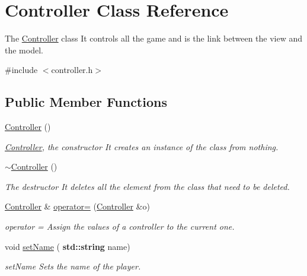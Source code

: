 \hypertarget{class_controller}{}\section{Controller Class Reference}
\label{class_controller}


The \hyperlink{class_controller}{Controller} class It controls all the game and is the link between the view and the model.  




{\ttfamily \#include $<$controller.\+h$>$}

\subsection*{Public Member Functions}
\begin{DoxyCompactItemize}
\item 
\mbox{\label{class_controller_a95c56822d667e94b031451729ce069a9}} 
\hyperlink{class_controller_a95c56822d667e94b031451729ce069a9}{Controller} ()
\begin{DoxyCompactList}\small\item\em \hyperlink{class_controller}{Controller}, the constructor It creates an instance of the class from nothing. \end{DoxyCompactList}\item 
\mbox{\label{class_controller_a0ab87934c4f7a266cfdb86e0f36bc1b5}} 
\hyperlink{class_controller_a0ab87934c4f7a266cfdb86e0f36bc1b5}{$\sim$\+Controller} ()
\begin{DoxyCompactList}\small\item\em The destructor It deletes all the element from the class that need to be deleted. \end{DoxyCompactList}\item 
\hyperlink{class_controller}{Controller} \& \hyperlink{class_controller_ab237d20daccadca0d4bad9194d17c306}{operator=} (\hyperlink{class_controller}{Controller} \&o)
\begin{DoxyCompactList}\small\item\em operator = Assign the values of a controller to the current one. \end{DoxyCompactList}\item 
void \hyperlink{class_controller_a177d0d6cd7cdb7784ae9c506debfa2c6}{set\+Name} (\textbf{ std\+::string} name)
\begin{DoxyCompactList}\small\item\em set\+Name Sets the name of the player. \end{DoxyCompactList}\item 

\end{DoxyCompactItemize}
